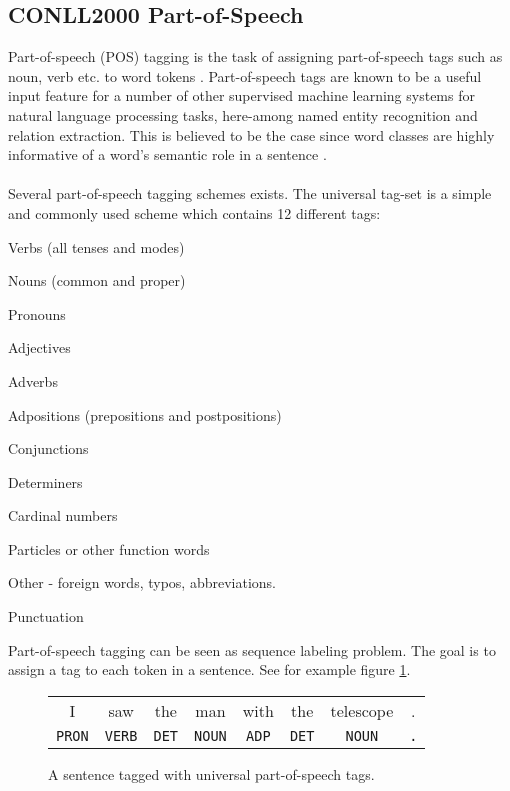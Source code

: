 \subsection{CONLL2000 Part-of-Speech}
Part-of-speech (POS) tagging is the task of assigning part-of-speech tags such as noun, verb etc. to word tokens \citep{jurafsky09}. Part-of-speech tags are known to be a useful input feature for a number of other supervised machine learning systems for natural language processing tasks, here-among named entity recognition and relation extraction. This is believed to be the case since word classes are highly informative of a word's semantic role in a sentence \citep{jurafsky09}.
\\\\
Several part-of-speech tagging schemes exists. The universal tag-set is a simple and commonly used scheme which contains 12 different tags:
\begin{description}[labelindent=4em,leftmargin=4em]
	\item [VERB] Verbs (all tenses and modes)
	\item [NOUN] Nouns (common and proper)
	\item [PRON] Pronouns
	\item [ADJ] Adjectives
	\item [ADV] Adverbs
	\item [ADP] Adpositions (prepositions and postpositions)
	\item [CONJ] Conjunctions
	\item [DET] Determiners
	\item [NUM] Cardinal numbers
	\item [PRT] Particles or other function words
	\item [X] Other - foreign words, typos, abbreviations.
	\item [.] Punctuation
\end{description}
\noindent
Part-of-speech tagging can be seen as sequence labeling problem. The goal is to assign a tag to each token in a sentence. See for example figure \ref{pos}.
\begin{figure}[h!]
	\begin{center}
		\begin{tabular}{c c c c c c c c}
	I & saw & the & man & with & the & telescope & . \\
	\texttt{PRON} & \texttt{VERB} & \texttt{DET} & \texttt{NOUN} & \texttt{ADP} & \texttt{DET} & \texttt{NOUN} & \texttt{.}
		\end{tabular}
	\end{center}
	\caption{A sentence tagged with universal part-of-speech tags.}
	\label{pos}
\end{figure}

